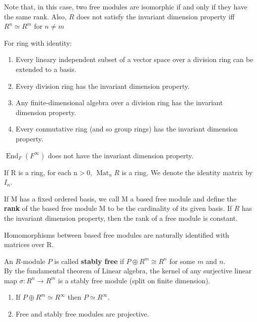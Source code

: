 Note that, in this case, two free modules are isomorphic if and only if they have the same rank. Also, $R$ does not satisfy the invariant dimension property iff $R^n \simeq R^m$ for $n\neq m$ \\

\begin{theo} For ring with identity:
    \begin{enumerate}
        \item Every lineary independent subset of a vector space over a division ring can be extended to a basis.
        \item Every division ring has the invariant dimension property.
        \item Any finite-dimensional algebra over a division ring has the invariant dimension property.
        \item Every conmutative ring (and so group rings) has the invariant dimension property.
    \end{enumerate}
    \end{theo}

\begin{example}
    $\operatorname{End}_F(F^\infty)$ does not have the invariant dimension property.
\end{example}


If R is a ring, for each $\mathrm{n}>0$, $\operatorname{Mat}_n R$ is a ring. We denote the identity matrix by $I_n$.

If M has a ﬁxed ordered basis, we call M a based free module and deﬁne the {\bfseries rank} of the based free module M to be the cardinality of its given basis. If $R$ has the invariant dimension property, then the rank of a free module is constant.
\begin{theo}
    Homomorphisms between based free modules are naturally identiﬁed with
    matrices over R.
\end{theo}

An $R$-module $P$ is called {\bfseries stably free} if $P \oplus R^m \cong R^n$ for some $m$ and $n$.\\
By the fundamental theorem of Linear algebra, the kernel of any surjective linear map $\sigma: R^n \rightarrow R^m$ is a stably free module (split on finite dimension).

\begin{lemm}
    \begin{enumerate}
    \item If $P\oplus R^m \simeq R ^ \infty$ then $P \simeq R^\infty$.
    \item Free and stably free modules are projective.
    \end{enumerate}
\end{lemm}

